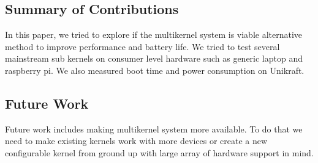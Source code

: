\documentclass[11pt]{article}       %
\begin{document}
\subsection{Summary of Contributions}
In this paper, we tried to explore if the multikernel system is viable alternative method to improve performance and battery life. We tried to test several mainstream sub kernels on consumer level hardware such as generic laptop and raspberry pi. We also measured boot time and power consumption on Unikraft.
\subsection{Future Work}
Future work includes making multikernel system more available. To do that we need to make existing kernels work with more devices or create a new configurable kernel from ground up with large array of hardware support in mind.




\end{document}
